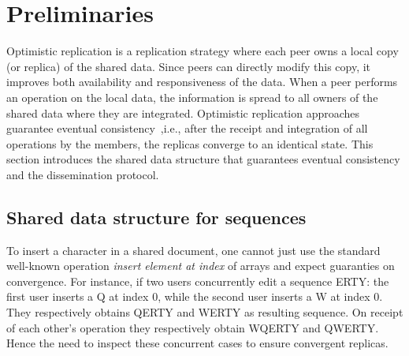 
\section{Preliminaries}
\label{sec:preliminaries}

Optimistic replication is a replication strategy where each peer owns a local
copy (or replica) of the shared data. Since peers can directly modify this copy,
it improves both availability and responsiveness of the data. When a peer
performs an operation on the local data, the information is spread to all owners
of the shared data where they are integrated. Optimistic replication approaches
guarantee eventual consistency~\cite{bailis2013eventual},i.e., after the
receipt and integration of all operations by the members, the replicas converge
to an identical state. This section introduces the shared data structure that
guarantees eventual consistency and the dissemination protocol.

\subsection{Shared data structure for sequences}

To insert a character in a shared document, one cannot just use the standard
well-known operation \emph{insert element at index} of arrays and expect
guaranties on convergence. For instance, if two users concurrently edit a
sequence ERTY: the first user inserts a Q at index 0, while the second user
inserts a W at index 0. They respectively obtains QERTY and WERTY as resulting
sequence. On receipt of each other's operation they respectively obtain WQERTY
and QWERTY. Hence the need to inspect these concurrent cases to ensure
convergent replicas.

